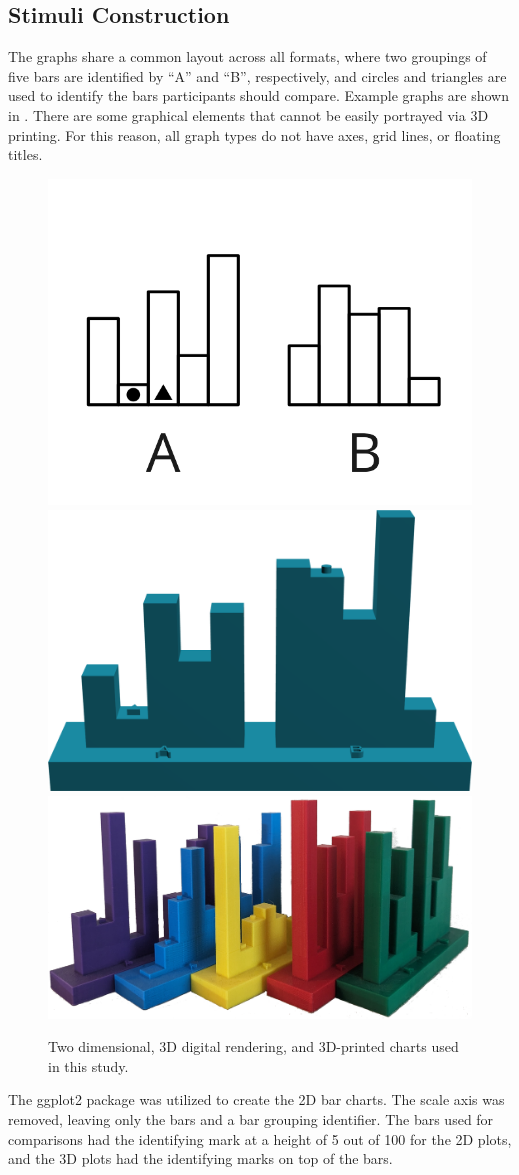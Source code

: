 \documentclass[letterpaper,inpress,dvipsnames]{jdsart}
\begin{document}
\hypertarget{stimuli-construction}{%
\subsection{Stimuli Construction}\label{stimuli-construction}}

The graphs share a common layout across all formats, where two groupings of five bars are identified by ``A'' and ``B'', respectively, and circles and triangles are used to identify the bars participants should compare. Example graphs are shown in
.
There are some graphical elements that cannot be easily portrayed via 3D printing. For this reason, all graph types do not have axes, grid lines, or floating titles.

\begin{figure}
\includegraphics[width=0.3\linewidth]{_images/Type1-Rep01} \includegraphics[width=0.3\linewidth]{_images/RenderedChart} \includegraphics[width=0.35\linewidth]{_images/Kit_of_charts} \caption{Two dimensional, 3D digital rendering, and 3D-printed charts used in this study.}\label{fig:plotTypes}
\end{figure}

The ggplot2 \citep{ggplot2} package was utilized to create the 2D bar charts.
The scale axis was removed, leaving only the bars and a bar grouping identifier.
The bars used for comparisons had the identifying mark at a height of 5 out of 100 for the 2D plots, and the 3D plots had the identifying marks on top of the bars.
\end{document}
